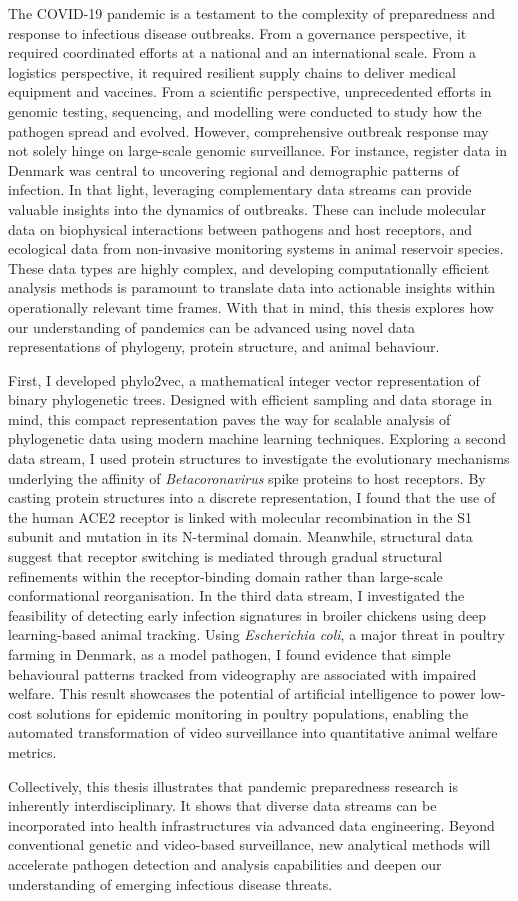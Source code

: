 The COVID-19 pandemic is a testament to the complexity of preparedness and response to infectious disease outbreaks. From a governance perspective, it required coordinated efforts at a national and an international scale. From a logistics perspective, it required resilient supply chains to deliver medical equipment and vaccines. From a scientific perspective, unprecedented efforts in genomic testing, sequencing, and modelling were conducted to study how the pathogen spread and evolved. However, comprehensive outbreak response may not solely hinge on large-scale genomic surveillance. For instance, register data in Denmark was central to uncovering regional and demographic patterns of infection. In that light, leveraging complementary data streams can provide valuable insights into the dynamics of outbreaks. These can include molecular data on biophysical interactions between pathogens and host receptors, and ecological data from non-invasive monitoring systems in animal reservoir species. These data types are highly complex, and developing computationally efficient analysis methods is paramount to translate data into actionable insights within operationally relevant time frames. With that in mind, this thesis explores how our understanding of pandemics can be advanced using novel data representations of phylogeny, protein structure, and animal behaviour.

First, I developed phylo2vec, a mathematical integer vector representation of binary phylogenetic trees. Designed with efficient sampling and data storage in mind, this compact representation paves the way for scalable analysis of phylogenetic data using modern machine learning techniques. Exploring a second data stream, I used protein structures to investigate the evolutionary mechanisms underlying the affinity of \textit{Betacoronavirus} spike proteins to host receptors. By casting protein structures into a discrete representation, I found that the use of the human ACE2 receptor is linked with molecular recombination in the S1 subunit and mutation in its N-terminal domain. Meanwhile, structural data suggest that receptor switching is mediated through gradual structural refinements within the receptor-binding domain rather than large-scale conformational reorganisation. In the third data stream, I investigated the feasibility of detecting early infection signatures in broiler chickens using deep learning-based animal tracking. Using \textit{Escherichia coli}, a major threat in poultry farming in Denmark, as a model pathogen, I found evidence that simple behavioural patterns tracked from videography are associated with impaired welfare. This result showcases the potential of artificial intelligence to power low-cost solutions for epidemic monitoring in poultry populations, enabling the automated transformation of video surveillance into quantitative animal welfare metrics.

Collectively, this thesis illustrates that pandemic preparedness research is inherently interdisciplinary. It shows that diverse data streams can be incorporated into health infrastructures via advanced data engineering. Beyond conventional genetic and video-based surveillance, new analytical methods will accelerate pathogen detection and analysis capabilities and deepen our understanding of emerging infectious disease threats.
